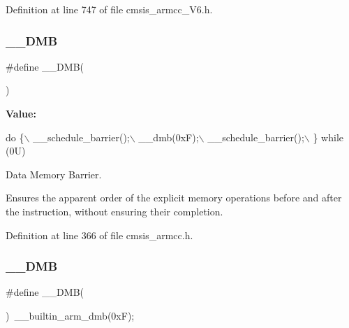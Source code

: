 Definition at line 747 of file cmsis\+\_\+armcc\+\_\+\+V6.\+h.

\mbox{\label{group___c_m_s_i_s___core___instruction_interface_ga671101179b5943990785f36f8c1e2269}} 
\subsubsection{\texorpdfstring{\+\_\+\+\_\+\+D\+MB}{\_\_DMB}\hspace{0.1cm}{\footnotesize\ttfamily [1/2]}}
{\footnotesize\ttfamily \#define \+\_\+\+\_\+\+D\+MB(\begin{DoxyParamCaption}{ }\end{DoxyParamCaption})}

{\bfseries Value\+:}
\begin{DoxyCode}
\textcolor{keywordflow}{do} \{\(\backslash\)
                   \_\_schedule\_barrier();\(\backslash\)
                   \_\_dmb(0xF);\(\backslash\)
                   \_\_schedule\_barrier();\(\backslash\)
                \} \textcolor{keywordflow}{while} (0U)
\end{DoxyCode}


Data Memory Barrier. 

Ensures the apparent order of the explicit memory operations before and after the instruction, without ensuring their completion. 

Definition at line 366 of file cmsis\+\_\+armcc.\+h.

\mbox{\label{group___c_m_s_i_s___core___instruction_interface_ga671101179b5943990785f36f8c1e2269}} 
\subsubsection{\texorpdfstring{\+\_\+\+\_\+\+D\+MB}{\_\_DMB}\hspace{0.1cm}{\footnotesize\ttfamily [2/2]}}
{\footnotesize\ttfamily \#define \+\_\+\+\_\+\+D\+MB(\begin{DoxyParamCaption}{ }\end{DoxyParamCaption})~\+\_\+\+\_\+builtin\+\_\+arm\+\_\+dmb(0x\+F);}



